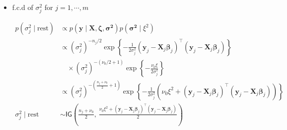 \begin{appendix}
\begin{itemize}
\begin{equation}
\begin{split}
p(\bm{\Sigma} \mid \text{rest}) 
&\propto  p(\bm{\zeta} \mid \bm{\beta}, \bm{\Sigma}) 
p(\bm{\Sigma}) \\
&\propto |\bm{\Sigma}|^{-m/2} \exp\left\{ -\frac{1}{2} \sum_{j=1}^{m} (\bm{\beta}_j - \bm{\beta})^\top \bm{\Sigma}^{-1} (\bm{\beta}_j - \bm{\beta}) \right\} \\
&\quad \times |\bm{\Sigma}|^{-(n_0 + p + 1)/2} \exp\left\{ -\frac{1}{2} \operatorname{tr}(\bm{S}_0 \bm{\Sigma}^{-1}) \right\} \\[6pt]
&\propto |\bm{\Sigma}|^{-(n_0 + m + p + 1)/2} 
\exp\left\{ -\frac{1}{2} \operatorname{tr} \left(\left[ \bm{S}_0 + \sum_{j=1}^{m} (\bm{\beta}_j - \bm{\beta})(\bm{\beta}_j - \bm{\beta})^\top\right]  \bm{\Sigma}^{-1} \right)\right\}\\
\bm{\Sigma} \mid \text{rest} &\sim \mathsf{IW} \left( 
n_0 + m,\ 
\left( \bm{S}_0 + \sum_{j=1}^{m} (\bm{\beta}_j - \bm{\beta})(\bm{\beta}_j - \bm{\beta})^\top\right)^{-1}
\right)
\end{split}
\end{equation}

\newpage

\item f.c.d of $\sigma_j^2$ for $j=1,\cdots,m$

\begin{equation}
\begin{split}
p(\sigma_j^2 \mid \text{rest}) 
&\propto p(\bm{y} \mid \bm{X}, \bm{\zeta} ,\bm{\sigma^2}) 
p(\bm{\sigma^2}\mid 
\xi^2) \\
&\propto  ( \sigma_j^2)^{-n_j/2} 
\exp \left\{ -\frac{1}{2\sigma_j^2} (\bm{y}_{j} - \bm{X}_{j} \bm{\beta}_j)^\top(\bm{y}_{j} - \bm{X}_{j} \bm{\beta}_j)  \right\} \\
&\quad \times  (\sigma_j^2)^{-(\nu_0 / 2 + 1)} 
\exp\left\{ -\frac{\nu_0 \xi}{2\sigma_j^2} \right\}\\
&\propto  (\sigma_j^2)^{-\left( \frac{n_j + \nu_0}{2} + 1 \right)} 
\exp\left\{ -\frac{1}{2\sigma_j^2} \left( \nu_0 \xi^2 +  (\bm{y}_{j} - \bm{X}_{j} \bm{\beta}_j)^\top(\bm{y}_{j} - \bm{X}_{j} \bm{\beta}_j) \right) \right\}\\
\sigma_j^2 \mid \text{rest} &\sim \mathsf{IG} \left( 
\frac{n_j + \nu_0}{2},\ 
\frac{ \nu_0 \xi^2 +  (\bm{y}_{j} - \bm{X}_{j} \bm{\beta}_j)^\top(\bm{y}_{j} - \bm{X}_{j} \bm{\beta}_j)}{2} 
\right)
\end{split}
\end{equation}



\end{itemize}
\end{appendix}
